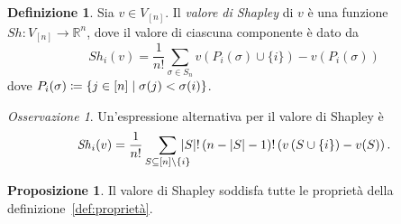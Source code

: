 \documentclass[a4paper,11pt]{article}
\theoremstyle{definition}				%
\newtheorem{definizione}{Definizione}%
\newtheorem{proposizione}{Proposizione}
\theoremstyle{remark}
\newtheorem{oss}{Osservazione}%
\theoremstyle{plain}
\newcommand{\R}{\mathbb{R}}										%
\begin{document}
	\begin{definizione}
		Sia $v\in V_{[n]}$. Il \emph{valore di Shapley} di $v$ è una funzione $\mathit{Sh}\colon V_{[n]}\to\R^{n}$, dove il valore di ciascuna componente è dato da
		\[
			\mathit{Sh}_i(v)=\frac{1}{n!}\sum_{\sigma\in S_n} v\left(P_i(\sigma)\cup\{i\}\right)-v\left(P_i(\sigma)\right)
		\]	
		dove $P_i(\sigma)\coloneqq\qty{j\in[n]\mid \sigma(j)<\sigma(i)}$.
	\end{definizione}
	
	\begin{oss}\label{oss:Shapley_alternative}
		Un'espressione alternativa per il valore di Shapley è
		\begin{equation}\label{eqn:Shapley_alternative}
			\mathit{Sh}_i(v)=\frac{1}{n!}\smashoperator[r]{\sum_{S\subseteq[n]\setminus\{i\}}}\,\qty|S|!\left(n-\qty|S|-1\right)!\left(v\left(S\cup\{i\}\right)-v(S)\right).
		\end{equation}
	\end{oss}	
	\begin{proposizione}\label{prop:Shapley_proprietà}
		Il valore di Shapley soddisfa tutte le proprietà della definizione~\ref{def:proprietà}.
	\end{proposizione}
\end{document}
